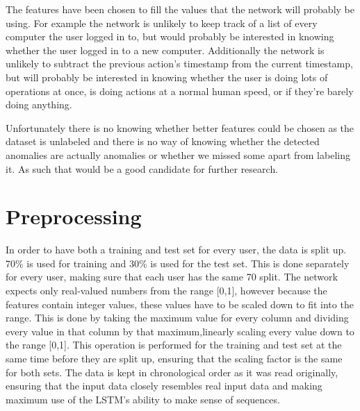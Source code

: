 The features have been chosen to fill the values that the network will probably be using. For example the network is unlikely to keep track of a list of every computer the user logged in to, but would probably be interested in knowing whether the user logged in to a new computer. Additionally the network is unlikely to subtract the previous action's timestamp from the current timestamp, but will probably be interested in knowing whether the user is doing lots of operations at once, is doing actions at a normal human speed, or if they're barely doing anything.

Unfortunately there is no knowing whether better features could be chosen as the dataset is unlabeled and there is no way of knowing whether the detected anomalies are actually anomalies or whether we missed some apart from labeling it. As such that would be a good candidate for further research.

\section{Preprocessing}
In order to have both a training and test set for every user, the data is split up. 70\% is used for training and 30\% is used for the test set. This is done separately for every user, making sure that each user has the same 70 split. The network expects only real-valued numbers from the range [0,1], however because the features contain integer values, these values have to be scaled down to fit into the range. This is done by taking the maximum value for every column and dividing every value in that column by that maximum,linearly scaling every value down to the range [0,1]. This operation is performed for the training and test set at the same time before they are split up, ensuring that the scaling factor is the same for both sets. The data is kept in chronological order as it was read originally, ensuring that the input data closely resembles real input data and making maximum use of the LSTM's ability to make sense of sequences.

